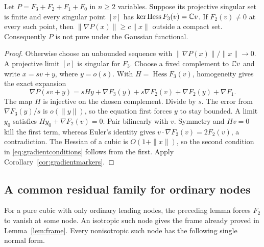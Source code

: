 \begin{lemma}\label{lem:nodecoercivity}
Let $P=F_3+F_2+F_1+F_0$ in $n\geq2$ variables. Suppose its
projective singular set is finite and every singular point $[v]$
has $\ker\operatorname{Hess}F_3(v)=\mathbb C v$. If $F_2(v)\ne0$ at
every such point, then
$\|\nabla P(x)\|\geq c\|x\|$ outside a compact set. Consequently
$P$ is not pure under the Gaussian functional.
\end{lemma}
\begin{proof}
Otherwise choose an unbounded sequence with
$\|\nabla P(x)\|/\|x\|\longrightarrow0$. A projective limit $[v]$
is singular for $F_3$. Choose a fixed complement to $\mathbb C v$ and write
$x=sv+y$, where $y=o(s)$. With $H=\operatorname{Hess}F_3(v)$,
homogeneity gives the exact expansion
\[
 \nabla P(sv+y)=sHy+\nabla F_3(y)+s\nabla F_2(v)
                              +\nabla F_2(y)+\nabla F_1.
\]
The map $H$ is injective on the chosen complement. Divide by $s$.
The error from $\nabla F_3(y)/s$ is $o(\|y\|)$, so the equation
first forces $y$ to stay bounded. A limit $y_0$ satisfies
$Hy_0+\nabla F_2(v)=0$. Pair bilinearly with $v$. Symmetry and
$Hv=0$ kill the first term, whereas Euler's identity gives
$v\cdot\nabla F_2(v)=2F_2(v)$, a contradiction.
The Hessian of a cubic is $O(1+\|x\|)$, so the second condition
in \eqref{eq:gradientconditions} follows from the first. Apply
Corollary~\ref{cor:gradientmarkers}.
\end{proof}

\subsection{A common residual family for ordinary nodes}
\label{sec:ordinaryresidual}

For a pure cubic with only ordinary leading nodes, the preceding
lemma forces $F_2$ to vanish at some node. An isotropic such node
gives the frame already proved in Lemma~\ref{lem:frame}. Every
nonisotropic such node has the following single normal form.

